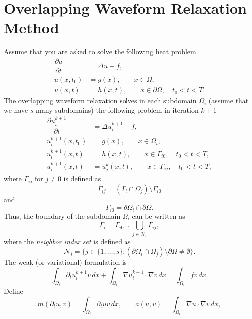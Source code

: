 \documentclass[a4paper, 11pt]{article}
\theoremstyle{plain}
\theoremstyle{definition}
\theoremstyle{remark}
\begin{document}
\section{Overlapping Waveform Relaxation Method}
Assume that you are asked to solve the following heat problem
\begin{align*}
    \dfrac{\partial u}{\partial t} &= \Delta u + f,\\
    u(x, t_{0}) &= g(x), \qquad x\in \Omega,\\
    u(x, t) &= h(x, t), \qquad x\in \partial\Omega, \quad t_0<t<T.
\end{align*}
The overlapping waveform relaxation solves in each subdomain $\Omega_i$ (assume that we have $s$ many subdomains) the following problem in iteration $k+1$
\begin{align*}
    \dfrac{\partial u_{i}^{k+1}}{\partial t} &= \Delta u_{i}^{k+1} + f,\\
    u_{i}^{k+1}(x, t_{0}) &= g(x), \qquad x\in \Omega_{i},\\
    u_{i}^{k+1}(x, t) &= h(x, t), \qquad x\in \Gamma_{i0}, \quad t_0<t<T,\\
    u_{i}^{k+1}(x, t) &= u_{j}^{k}(x, t), \qquad x\in \Gamma_{ij}, \quad t_0<t<T,
\end{align*}
where $\Gamma_{ij}$ for $j\neq 0$ is defined as
\begin{equation*}
    \Gamma_{ij} = \left(\Gamma_{i}\cap\Omega_{j}\right)\setminus \Gamma_{i0}
\end{equation*}
and
\begin{equation*}
    \Gamma_{i0} = \partial \Omega_{i} \cap \partial\Omega.
\end{equation*}
Thus, the boundary of the subdomain $\Omega_{i}$ can be written as
\begin{equation*}
    \Gamma_{i} = \Gamma_{i0} \cup \bigcup_{j\in \mathcal{N}_{i}}\Gamma_{ij},
\end{equation*}
where the \textit{neighbor index set} is defined as
\begin{equation*}
    \mathcal{N}_{i} = \{j\in \{1, \ldots, s\}: \left(\partial\Omega_{i}\cap\Omega_{j}\right)\setminus \partial\Omega \neq \emptyset\}.
\end{equation*}
The weak (or variational) formulation is
\begin{equation*}
    \int_{\Omega_{i}}\partial_{t} u_{i}^{k+1} v\,dx + \int_{\Omega_{i}}\nabla u_{i}^{k+1} \cdot \nabla v\,dx = \int_{\Omega_{i}}fv\,dx.
\end{equation*}
Define
\begin{equation*}
    m(\partial_{t} u, v) = \int_{\Omega_{i}}\partial_{t} u v\,dx, \qquad a(u, v) = \int_{\Omega_{i}}\nabla u \cdot \nabla v\,dx, 
\end{equation*}
\end{document}
